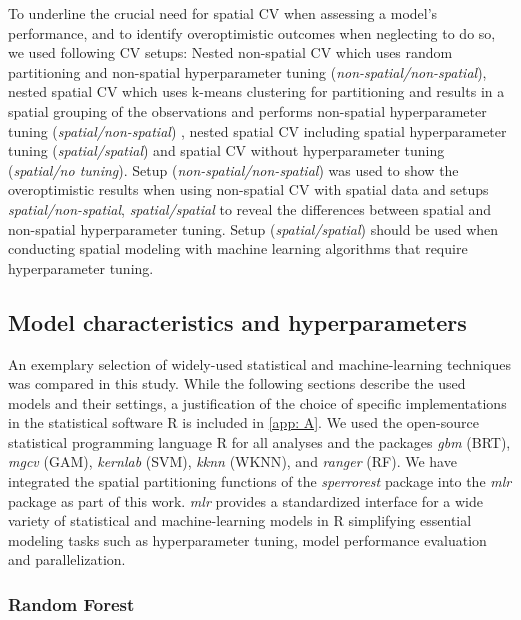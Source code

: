 \documentclass[review]{elsarticle}
\begin{document}
To underline the crucial need for spatial \ac{CV} when assessing a model's performance, and to identify overoptimistic outcomes when neglecting to do so, we used following CV setups:
Nested non-spatial \ac{CV} which uses random partitioning and non-spatial hyperparameter tuning (\emph{non-spatial/non-spatial}),
nested spatial \ac{CV} which uses k-means clustering for partitioning \citep{Brenning2005} and results in a spatial grouping of the observations and performs non-spatial hyperparameter tuning (\emph{spatial/non-spatial}) ,
nested spatial \ac{CV} including spatial hyperparameter tuning (\emph{spatial/spatial}) and
spatial \ac{CV} without hyperparameter tuning (\emph{spatial/no tuning}).
Setup (\emph{non-spatial/non-spatial}) was used to show the overoptimistic results when using non-spatial \ac{CV} with spatial data and setups \emph{spatial/non-spatial}, \emph{spatial/spatial} to reveal the differences between spatial and non-spatial hyperparameter tuning.
Setup (\emph{spatial/spatial}) should be used when conducting spatial modeling with machine learning algorithms that require hyperparameter tuning.

\subsection{Model characteristics and hyperparameters}
\label{subsec:mod_chars}

An exemplary selection of widely-used statistical and machine-learning techniques was compared in this study.
While the following sections describe the used models and their settings, a justification of the choice of specific implementations in the statistical software R is included in \autoref{app: A}.
We used the open-source statistical programming language R \citep{R_core} for all analyses and the packages \textit{gbm} \citep{gbm} (\ac{BRT}), \textit{mgcv} \citep{mgcv} (\ac{GAM}), \textit{kernlab} \citep{kernlab} (\ac{SVM}), \textit{kknn} \citep{kknn} (\ac{WKNN}), and \textit{ranger} \citep{ranger} (\ac{RF}).
We have integrated the spatial partitioning functions of the \textit{sperrorest} package into the \textit{mlr} package as part of this work.
\textit{mlr} provides a standardized interface for a wide variety of statistical and machine-learning models in R simplifying essential modeling tasks such as hyperparameter tuning, model performance evaluation and parallelization.

\subsubsection{Random Forest}
\end{document}
